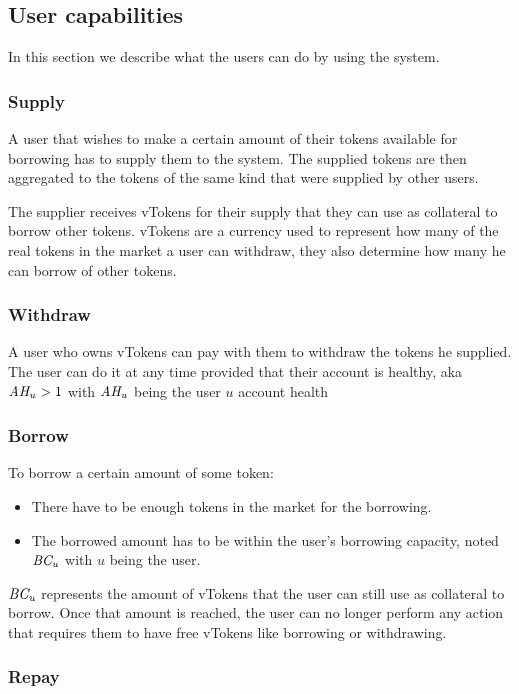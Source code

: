 \subsection{User capabilities}

In this section we describe what the users can do by using the system.

\subsubsection{Supply}

A user that wishes to make a certain amount of their tokens available for borrowing has to supply them to the system. The supplied tokens are then aggregated to the tokens of the same kind that were supplied by other users.

The supplier receives vTokens for their supply that they can use as collateral to borrow other tokens. vTokens are a currency used to represent how many of the real tokens in the market a user can withdraw, they also determine how many he can borrow of other tokens.

\subsubsection{Withdraw}

A user who owns vTokens can pay with them to withdraw the tokens he supplied. The user can do it at any time provided that their account is healthy, aka $\mathit{AH_{u}} > 1$ with $\mathit{AH_{u}}$ being the user $u$ account health

\subsubsection{Borrow}
To borrow a certain amount of some token:

\begin{itemize}
  \item There have to be enough tokens in the market for the borrowing.
  \item The borrowed amount has to be within the user's borrowing capacity, noted $\mathit{BC_{u}}$ with $u$ being the user.
\end{itemize}

$\mathit{BC_{u}}$ represents the amount of vTokens that the user can still use as collateral to borrow. Once that amount is reached, the user can no longer perform any action that requires them to have free vTokens like borrowing or withdrawing.

\subsubsection{Repay}

